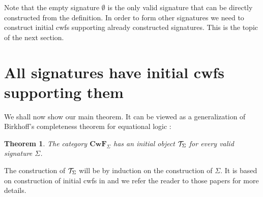 \documentclass{lmcs}
\newtheorem{theorem}{Theorem}
\def\Cwf{\mathbf{CwF}}
\begin{document}
Note that the empty signature $\emptyset$ is the only valid signature that can be directly constructed from the definition. In order to form other signatures we need to construct initial cwfs supporting already constructed signatures. This is the topic of the next section.

\section{All signatures have initial cwfs supporting them}

We shall now show our main theorem. It can be viewed as a generalization of Birkhoff's completeness theorem for equational logic \cite{birkhoff}:
\begin{theorem}
The category $\Cwf_\Sigma$ has an initial object ${\mathcal T}_\Sigma$ for every valid signature $\Sigma$.
\end{theorem}

The construction of ${\mathcal T}_\Sigma$ will be by induction on the construction of $\Sigma$. It is based on construction of initial cwfs in \cite{castellan:tlca2015,castellan:lmcs} and we refer the reader to those papers for more details. 
\end{document}
